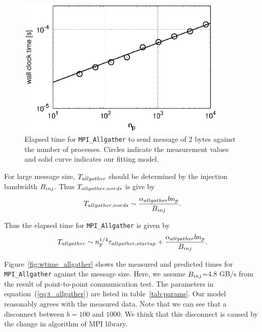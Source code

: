 \documentclass[dvipdfmx]{pasj01}
\begin{document}
\begin{figure}
    \begin{center}
      \includegraphics[width=10cm]{./fig/wtime_allgather_startup.eps}
    \end{center}
  \caption{Elapsed time for {\tt MPI\_Allgather} to send message of 2
    bytes against the number of processes. Circles indicate the
    measurement values and solid curve indicates our fitting model.}
  \label{fig:wtime_allgather_startup}
\end{figure}

For large message size, $T_{\rm allgather}$ should be determined by
the injection bandwidth $B_{\rm inj}$. Thus $T_{\rm allgather, words}$
is give by
\begin{equation}
  T_{\rm allgather, words} \sim \frac{\alpha_{\rm allgather} b n_{\rm p}}{B_{\rm inj}}.
\end{equation}

Thus the elapsed time for {\tt MPI\_Allgather} is given by
\begin{equation}
  T_{\rm allgather} \sim n^{1/4}_{\rm p} \tau_{\rm allgather, startup} + \frac{\alpha_{\rm allgather} b n_{\rm p}}{B_{\rm inj}}.
  \label{eq:t_allgather}
\end{equation}

Figure~\ref{fig:wtime_allgather} shows the measured and predicted
times for {\tt MPI\_Allgather} against the message size. Here, we
assume $B_{\rm inj}$=4.8 GB/s from the result of point-to-point
communication test. The parameters in equation~(\ref{eq:t_allgather})
are listed in table~\ref{tab:params}. Our model reasonably agrees with
the measured data. Note that we can see that a disconnect between
$b=100$ and $1000$. We think that this disconnect is caused by the
change in algorithm of MPI library.
\end{document}
